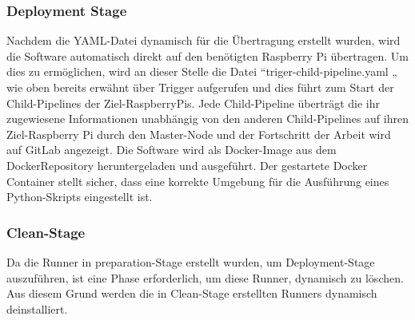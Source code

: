 \subsubsection*{Deployment Stage}

Nachdem die YAML-Datei dynamisch für die Übertragung erstellt wurden, wird die Software automatisch direkt auf den benötigten Raspberry Pi übertragen. Um dies zu ermöglichen, wird an dieser Stelle die Datei “triger-child-pipeline.yaml „ wie oben bereits erwähnt über Trigger aufgerufen und dies führt zum Start der Child-Pipelines der Ziel-RaspberryPis. Jede Child-Pipeline überträgt die ihr zugewiesene Informationen unabhängig von den anderen Child-Pipelines auf ihren Ziel-Raspberry Pi durch den Master-Node und der Fortschritt der Arbeit wird auf GitLab angezeigt. Die Software wird als Docker-Image aus dem DockerRepository heruntergeladen und ausgeführt. Der gestartete Docker Container stellt sicher, dass eine korrekte Umgebung für die Ausführung eines Python-Skripts eingestellt ist.

\subsubsection*{Clean-Stage}

Da die Runner in preparation-Stage erstellt wurden, um Deployment-Stage auszuführen, ist eine Phase erforderlich, um diese Runner, dynamisch zu löschen. Aus diesem Grund werden die in Clean-Stage erstellten Runners dynamisch deinstalliert.